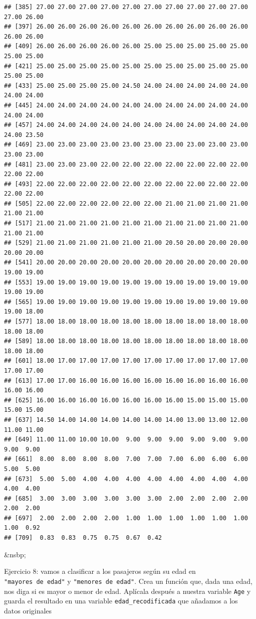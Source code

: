 \documentclass[11pt,]{book}
\begin{document}
\begin{verbatim}
## [385] 27.00 27.00 27.00 27.00 27.00 27.00 27.00 27.00 27.00 27.00 27.00 26.00
## [397] 26.00 26.00 26.00 26.00 26.00 26.00 26.00 26.00 26.00 26.00 26.00 26.00
## [409] 26.00 26.00 26.00 26.00 26.00 25.00 25.00 25.00 25.00 25.00 25.00 25.00
## [421] 25.00 25.00 25.00 25.00 25.00 25.00 25.00 25.00 25.00 25.00 25.00 25.00
## [433] 25.00 25.00 25.00 25.00 24.50 24.00 24.00 24.00 24.00 24.00 24.00 24.00
## [445] 24.00 24.00 24.00 24.00 24.00 24.00 24.00 24.00 24.00 24.00 24.00 24.00
## [457] 24.00 24.00 24.00 24.00 24.00 24.00 24.00 24.00 24.00 24.00 24.00 23.50
## [469] 23.00 23.00 23.00 23.00 23.00 23.00 23.00 23.00 23.00 23.00 23.00 23.00
## [481] 23.00 23.00 23.00 22.00 22.00 22.00 22.00 22.00 22.00 22.00 22.00 22.00
## [493] 22.00 22.00 22.00 22.00 22.00 22.00 22.00 22.00 22.00 22.00 22.00 22.00
## [505] 22.00 22.00 22.00 22.00 22.00 22.00 21.00 21.00 21.00 21.00 21.00 21.00
## [517] 21.00 21.00 21.00 21.00 21.00 21.00 21.00 21.00 21.00 21.00 21.00 21.00
## [529] 21.00 21.00 21.00 21.00 21.00 21.00 20.50 20.00 20.00 20.00 20.00 20.00
## [541] 20.00 20.00 20.00 20.00 20.00 20.00 20.00 20.00 20.00 20.00 19.00 19.00
## [553] 19.00 19.00 19.00 19.00 19.00 19.00 19.00 19.00 19.00 19.00 19.00 19.00
## [565] 19.00 19.00 19.00 19.00 19.00 19.00 19.00 19.00 19.00 19.00 19.00 18.00
## [577] 18.00 18.00 18.00 18.00 18.00 18.00 18.00 18.00 18.00 18.00 18.00 18.00
## [589] 18.00 18.00 18.00 18.00 18.00 18.00 18.00 18.00 18.00 18.00 18.00 18.00
## [601] 18.00 17.00 17.00 17.00 17.00 17.00 17.00 17.00 17.00 17.00 17.00 17.00
## [613] 17.00 17.00 16.00 16.00 16.00 16.00 16.00 16.00 16.00 16.00 16.00 16.00
## [625] 16.00 16.00 16.00 16.00 16.00 16.00 16.00 15.00 15.00 15.00 15.00 15.00
## [637] 14.50 14.00 14.00 14.00 14.00 14.00 14.00 13.00 13.00 12.00 11.00 11.00
## [649] 11.00 11.00 10.00 10.00  9.00  9.00  9.00  9.00  9.00  9.00  9.00  9.00
## [661]  8.00  8.00  8.00  8.00  7.00  7.00  7.00  6.00  6.00  6.00  5.00  5.00
## [673]  5.00  5.00  4.00  4.00  4.00  4.00  4.00  4.00  4.00  4.00  4.00  4.00
## [685]  3.00  3.00  3.00  3.00  3.00  3.00  2.00  2.00  2.00  2.00  2.00  2.00
## [697]  2.00  2.00  2.00  2.00  1.00  1.00  1.00  1.00  1.00  1.00  1.00  0.92
## [709]  0.83  0.83  0.75  0.75  0.67  0.42
\end{verbatim}

\&nsbp;

Ejercicio 8: vamos a clasificar a los pasajeros según su edad en \texttt{"mayores\ de\ edad"} y \texttt{"menores\ de\ edad"}. Crea un función que, dada una edad, nos diga si es mayor o menor de edad. Aplícala después a nuestra variable \texttt{Age} y guarda el resultado en una variable \texttt{edad\_recodificada} que añadamos a los datos originales
\end{document}
